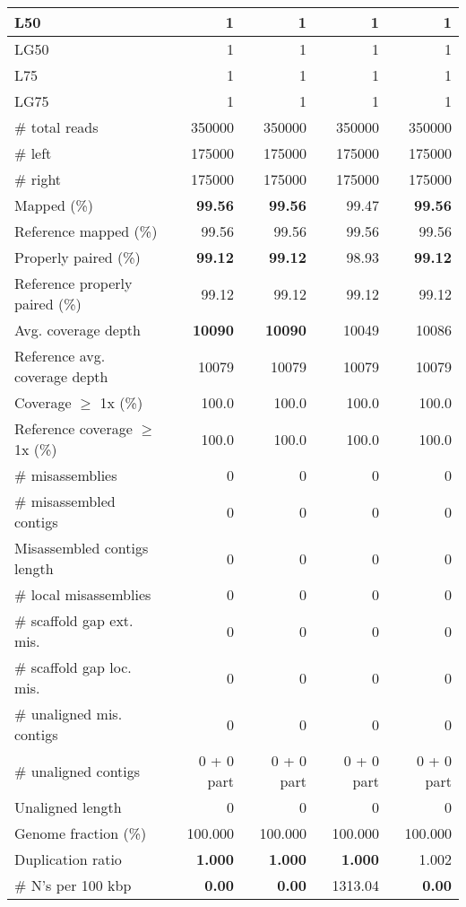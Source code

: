 \documentclass[12pt,a4paper]{article}
\begin{document}
\begin{table}[ht]
\begin{center}
\begin{tabular}{|l*{4}{|r}|}
L50 & 1 & 1 & 1 & 1 \\ \hline
LG50 & 1 & 1 & 1 & 1 \\ \hline
L75 & 1 & 1 & 1 & 1 \\ \hline
LG75 & 1 & 1 & 1 & 1 \\ \hline
\# total reads & 350000 & 350000 & 350000 & 350000 \\ \hline
\# left & 175000 & 175000 & 175000 & 175000 \\ \hline
\# right & 175000 & 175000 & 175000 & 175000 \\ \hline
Mapped (\%) & {\bf 99.56} & {\bf 99.56} & 99.47 & {\bf 99.56} \\ \hline
Reference mapped (\%) & 99.56 & 99.56 & 99.56 & 99.56 \\ \hline
Properly paired (\%) & {\bf 99.12} & {\bf 99.12} & 98.93 & {\bf 99.12} \\ \hline
Reference properly paired (\%) & 99.12 & 99.12 & 99.12 & 99.12 \\ \hline
Avg. coverage depth & {\bf 10090} & {\bf 10090} & 10049 & 10086 \\ \hline
Reference avg. coverage depth & 10079 & 10079 & 10079 & 10079 \\ \hline
Coverage $\geq$ 1x (\%) & 100.0 & 100.0 & 100.0 & 100.0 \\ \hline
Reference coverage $\geq$ 1x (\%) & 100.0 & 100.0 & 100.0 & 100.0 \\ \hline
\# misassemblies & 0 & 0 & 0 & 0 \\ \hline
\# misassembled contigs & 0 & 0 & 0 & 0 \\ \hline
Misassembled contigs length & 0 & 0 & 0 & 0 \\ \hline
\# local misassemblies & 0 & 0 & 0 & 0 \\ \hline
\# scaffold gap ext. mis. & 0 & 0 & 0 & 0 \\ \hline
\# scaffold gap loc. mis. & 0 & 0 & 0 & 0 \\ \hline
\# unaligned mis. contigs & 0 & 0 & 0 & 0 \\ \hline
\# unaligned contigs & 0 + 0 part & 0 + 0 part & 0 + 0 part & 0 + 0 part \\ \hline
Unaligned length & 0 & 0 & 0 & 0 \\ \hline
Genome fraction (\%) & 100.000 & 100.000 & 100.000 & 100.000 \\ \hline
Duplication ratio & {\bf 1.000} & {\bf 1.000} & {\bf 1.000} & 1.002 \\ \hline
\# N's per 100 kbp & {\bf 0.00} & {\bf 0.00} & 1313.04 & {\bf 0.00} \\ \hline

\end{tabular}
\end{center}
\end{table}
\end{document}
